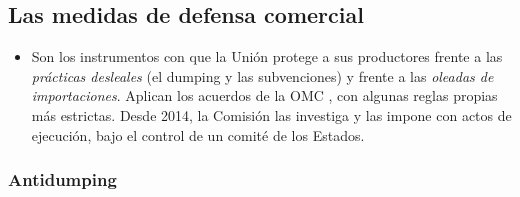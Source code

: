 \documentclass[11pt]{article}
\begin{document}
\subsection{Las medidas de defensa comercial}\label{sec:defensa}

\begin{itemize}
\item Son los instrumentos con que la Unión protege a sus productores frente a las \emph{prácticas desleales} (el dumping y las subvenciones) y frente a las \emph{oleadas de importaciones}. Aplican los acuerdos de la OMC , con algunas reglas propias más estrictas. Desde 2014, la Comisión las investiga y las impone con actos de ejecución, bajo el control de un comité de los Estados.
\end{itemize}

\subsubsection{Antidumping}\label{sec:antidumping}
\end{document}
